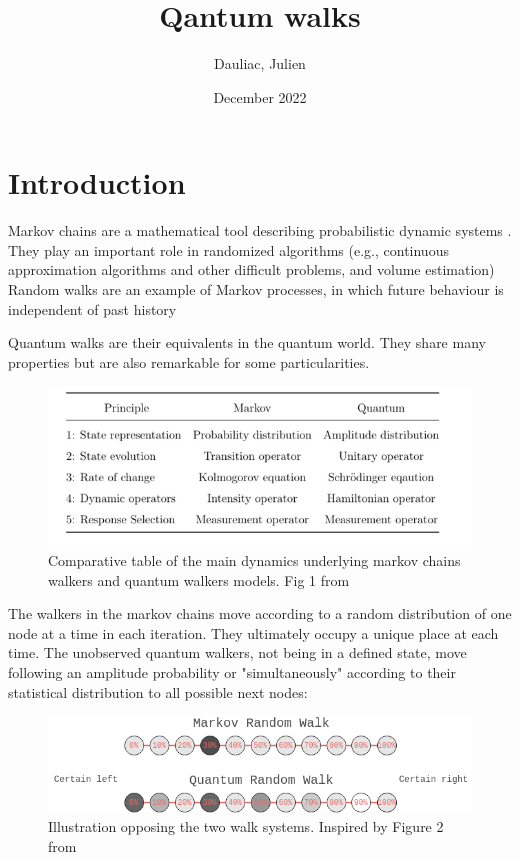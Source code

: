 \documentclass[9pt,journal,compsoc]{IEEEtran}
\title{Qantum walks}
\author{Dauliac, Julien}
\date{December 2022}
\begin{document}
    \maketitle
    
    \section{Introduction}
        Markov chains are a mathematical tool describing probabilistic dynamic systems \cite{motwani1995randomized}.
        They play an important role in randomized algorithms (e.g., continuous approximation algorithms and other difficult problems, and volume estimation)
        Random walks are an example of Markov processes, in which future behaviour is independent of past history
        
        Quantum walks are their equivalents in the quantum world. They share many properties but are also remarkable for some particularities.        
        \begin{figure}[htp!]
            \centering
            \includegraphics[scale=0.34]{assets/img/forked-graph.png}
            \caption{Comparative table of the main dynamics underlying markov chains walkers and quantum walkers models. Fig 1 from \cite{busemeyer2020comparison}}
            \label{fig:diff}
        \end{figure}

        The walkers in the markov chains move according to a random distribution of one node at a time in each iteration. They ultimately occupy a unique place at each time.
        The unobserved quantum walkers, not being in a defined state, move following an amplitude probability or "simultaneously" according to their statistical distribution to all possible next nodes:
        \begin{figure}[htp!]
            \centering
            \includegraphics[width=\linewidth]{assets/img/schema3.png}
            \caption{Illustration opposing the two walk systems. Inspired by Figure 2 from \cite{busemeyer2020comparison}}
            \label{fig:opposing}
        \end{figure}
        
\end{document}
